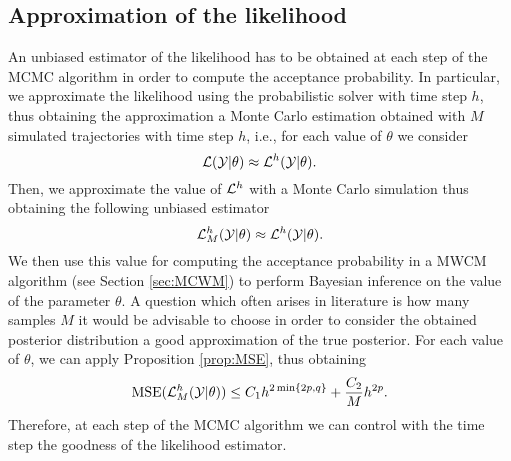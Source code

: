 \subsection{Approximation of the likelihood}

An unbiased estimator of the likelihood has to be obtained at each step of the MCMC algorithm in order to compute the acceptance probability. In particular, we approximate the likelihood using the probabilistic solver with time step $h$, thus obtaining the approximation a Monte Carlo estimation obtained with $M$ simulated trajectories with time step $h$, i.e., for each value of $\theta$ we consider
\begin{equation}
	\mathcal{L}(\mathcal Y|\theta) \approx \mathcal{L}^h(\mathcal Y|\theta).
\end{equation}
Then, we approximate the value of $\mathcal{L}^h$ with a Monte Carlo simulation thus obtaining the following unbiased estimator
\begin{equation}
	\mathcal{L}_M^h(\mathcal Y | \theta)  \approx \mathcal{L}^h(\mathcal Y|\theta).
\end{equation}
We then use this value for computing the acceptance probability in a MWCM algorithm (see Section \ref{sec:MCWM}) to perform Bayesian inference on the value of the parameter $\theta$. A question which often arises in literature \cite{ADH10, DPD15, PSG12} is how many samples $M$ it would be advisable to choose in order to consider the obtained posterior distribution a good approximation of the true posterior. For each value of $\theta$, we can apply Proposition \ref{prop:MSE}, thus obtaining 
\begin{equation}
	\operatorname{MSE}(\mathcal{L}_M^h(\mathcal Y | \theta)) \leq C_1 h^{2\min\{2p, q\}} + \frac{C_2}{M} h^{2p}.
\end{equation}
Therefore, at each step of the MCMC algorithm we can control with the time step the goodness of the likelihood estimator.

